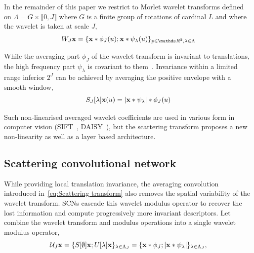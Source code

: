\documentclass{article}
\begin{document}
    In the remainder of this paper we restrict to Morlet wavelet transforms defined on $\Lambda = G \times \llbracket 0,J \rrbracket$ where $G$ is a finite group of rotations of cardinal $L$ and where the wavelet is taken at scale $J$,
    \vspace{-5pt}
    \begin{equation}
      \label{eq:wavelet transform}
      W_{J}\bfx = \{ \bfx \ast \phi_{J}(u); \bfx \ast \psi_{\lambda}(u) \}_{p\in\dsR^{2},\lambda \in \Lambda}
    \end{equation}
    \vspace{-15pt}

    While the averaging part $\phi_{J}$ of the wavelet transform is invariant to translations, the high frequency part $\psi_{\lambda}$ is covariant to them~\cite{mallat2012gis}. Invariance within a limited range inferior $2^{J}$ can be achieved by averaging the positive envelope with a smooth window,
    \vspace{-5pt}
    \begin{equation}
      \label{eq:Scattering transform}
      S_{J}[\lambda]{\bf x}(u) = \left| {\bf x} \ast \psi_{\lambda} \right| \ast \phi_{J}(u)
    \end{equation}
    \vspace{-10pt}
    
    Such non-linearised averaged wavelet coefficients are used in various form in computer vision (SIFT~\cite{grabner2006fast}, DAISY~\cite{winder2009picking}), but the scattering transform proposes a new non-linearity as well as a layer based architecture.
  
  \subsection{Scattering convolutional network}
    \label{subsec:SCN/SCN}
    
    While providing local translation invariance, the averaging convolution introduced in~\ref{eq:Scattering transform} also removes the spatial variability of the wavelet transform. SCNs cascade this wavelet modulus operator to recover the lost information and compute progressively more invariant descriptors. Let combine the wavelet transform and modulus operations into a single wavelet modulus operator,
    \vspace{-5pt}
    \begin{equation}
      \mathcal{U}_{J} {\bf x} = \{ S[\emptyset] {\bf x} ; U[\lambda]{\bf x} \}_{\lambda \in \Lambda_{J}} 
          = \{ {\bf x} \ast \phi_{J}; \left| {\bf x} \ast \psi_{\lambda} \right| \}_{\lambda \in \Lambda_{J}},
      \label{eq:One step propagator}
    \end{equation}
    
\end{document}
